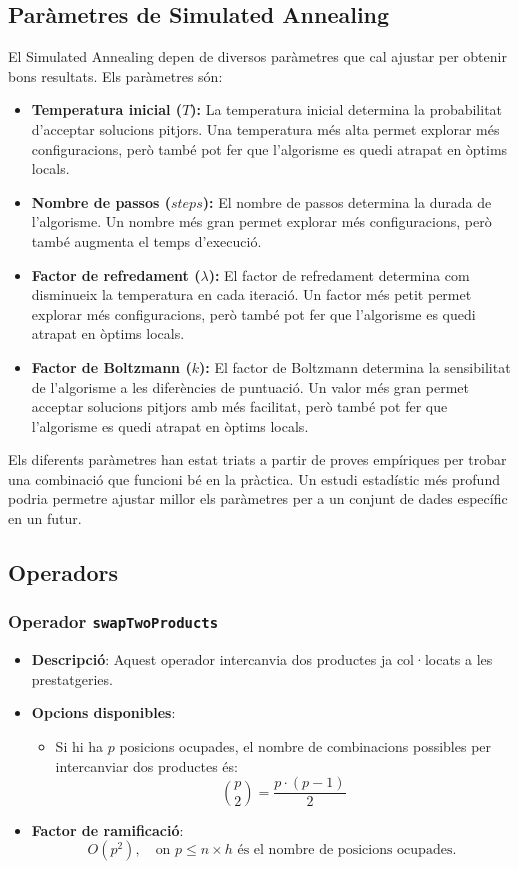 \documentclass[a4paper,12pt]{report}
\begin{document}
\begin{itemize}
\subsection{Paràmetres de Simulated Annealing}

El Simulated Annealing depen de diversos paràmetres que cal ajustar per obtenir bons resultats. Els paràmetres són:

\begin{itemize}
	\item \textbf{Temperatura inicial (\(T\)):} La temperatura inicial determina la probabilitat d'acceptar solucions pitjors. Una temperatura més alta permet explorar més configuracions, però també pot fer que l'algorisme es quedi atrapat en òptims locals. 
	\item \textbf{Nombre de passos (\(steps\)):} El nombre de passos determina la durada de l'algorisme. Un nombre més gran permet explorar més configuracions, però també augmenta el temps d'execució. 
	\item \textbf{Factor de refredament (\(\lambda\)):} El factor de refredament determina com disminueix la temperatura en cada iteració. Un factor més petit permet explorar més configuracions, però també pot fer que l'algorisme es quedi atrapat en òptims locals. 
	\item \textbf{Factor de Boltzmann (\(k\)):} El factor de Boltzmann determina la sensibilitat de l'algorisme a les diferències de puntuació. Un valor més gran permet acceptar solucions pitjors amb més facilitat, però també pot fer que l'algorisme es quedi atrapat en òptims locals. 
\end{itemize}

Els diferents paràmetres han estat triats a partir de proves empíriques per trobar una combinació que funcioni bé en la pràctica. Un estudi estadístic més profund podria permetre ajustar millor els paràmetres per a un conjunt de dades específic en un futur.

\subsection {Operadors}

\subsubsection{Operador \texttt{swapTwoProducts}}
\begin{itemize}
    \item \textbf{Descripció}: Aquest operador intercanvia dos productes ja col·locats a les prestatgeries.
    \item \textbf{Opcions disponibles}: 
    \begin{itemize}
        \item Si hi ha \(p\) posicions ocupades, el nombre de combinacions possibles per intercanviar dos productes és:
        \[
        \binom{p}{2} = \frac{p \cdot (p - 1)}{2}
        \]
    \end{itemize}
    \item \textbf{Factor de ramificació}:
    \[
    O(p^2), \quad \text{on } p \leq n \times h \text{ és el nombre de posicions ocupades.}
    \]
\end{itemize}


\end{itemize}
\end{document}
